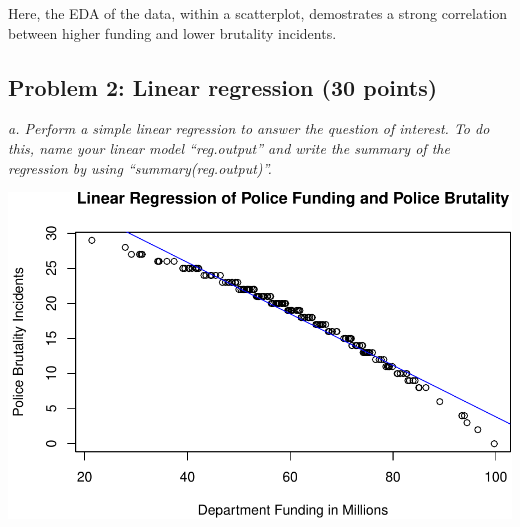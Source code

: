 \documentclass[
]{article}
\newenvironment{Shaded}{\begin{snugshade}}{\end{snugshade}}
\newcommand{\AttributeTok}[1]{\textcolor[rgb]{0.77,0.63,0.00}{#1}}
\newcommand{\FunctionTok}[1]{\textcolor[rgb]{0.00,0.00,0.00}{#1}}
\newcommand{\NormalTok}[1]{#1}
\newcommand{\OtherTok}[1]{\textcolor[rgb]{0.56,0.35,0.01}{#1}}
\newcommand{\SpecialCharTok}[1]{\textcolor[rgb]{0.00,0.00,0.00}{#1}}
\newcommand{\StringTok}[1]{\textcolor[rgb]{0.31,0.60,0.02}{#1}}
\begin{document}
Here, the EDA of the data, within a scatterplot, demostrates a strong
correlation between higher funding and lower brutality incidents.

\hypertarget{problem-2-linear-regression-30-points}{%
\subsection{Problem 2: Linear regression (30
points)}\label{problem-2-linear-regression-30-points}}

\emph{a. Perform a simple linear regression to answer the question of
interest. To do this, name your linear model ``reg.output'' and write
the summary of the regression by using ``summary(reg.output)''.}

\begin{Shaded}
\end{Shaded}

\includegraphics{Journal_files/figure-latex/unnamed-chunk-42-1.pdf}
\end{document}
